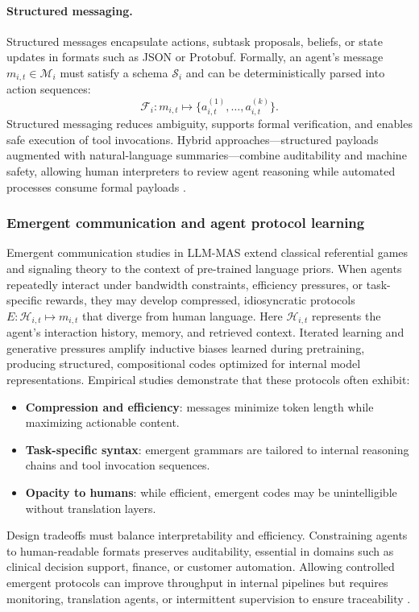 \paragraph{Structured messaging.} Structured messages encapsulate actions, subtask proposals, beliefs, or state updates in formats such as JSON or Protobuf. Formally, an agent’s message $m_{i,t} \in \mathcal{M}_i$ must satisfy a schema $\mathcal{S}_i$ and can be deterministically parsed into action sequences:
\[
\mathcal{F}_i: m_{i,t} \mapsto \{a_{i,t}^{(1)},\dots,a_{i,t}^{(k)}\}.
\]
Structured messaging reduces ambiguity, supports formal verification, and enables safe execution of tool invocations. Hybrid approaches—structured payloads augmented with natural-language summaries—combine auditability and machine safety, allowing human interpreters to review agent reasoning while automated processes consume formal payloads \cite{schick23}.

\subsubsection{Emergent communication and agent protocol learning}

Emergent communication studies in LLM-MAS extend classical referential games and signaling theory to the context of pre-trained language priors. When agents repeatedly interact under bandwidth constraints, efficiency pressures, or task-specific rewards, they may develop compressed, idiosyncratic protocols $E:\mathcal{H}_{i,t}\mapsto m_{i,t}$ that diverge from human language. Here $\mathcal{H}_{i,t}$ represents the agent’s interaction history, memory, and retrieved context. Iterated learning and generative pressures amplify inductive biases learned during pretraining, producing structured, compositional codes optimized for internal model representations. Empirical studies demonstrate that these protocols often exhibit:
\begin{itemize}
    \item \textbf{Compression and efficiency}: messages minimize token length while maximizing actionable content.
    \item \textbf{Task-specific syntax}: emergent grammars are tailored to internal reasoning chains and tool invocation sequences.
    \item \textbf{Opacity to humans}: while efficient, emergent codes may be unintelligible without translation layers.
\end{itemize}
Design tradeoffs must balance interpretability and efficiency. Constraining agents to human-readable formats preserves auditability, essential in domains such as clinical decision support, finance, or customer automation. Allowing controlled emergent protocols can improve throughput in internal pipelines but requires monitoring, translation agents, or intermittent supervision to ensure traceability \cite{emergent_coordination}.



